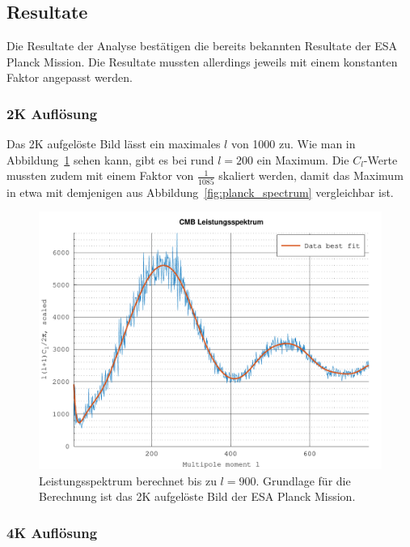 \subsection{Resultate \label{subsec:cmb:results}}

Die Resultate der Analyse bestätigen die bereits bekannten Resultate der ESA 
Planck Mission. Die Resultate mussten allerdings jeweils mit einem konstanten 
Faktor angepasst werden.

\subsubsection{2K Auflösung}

Das 2K aufgelöste Bild lässt ein maximales $l$ von 1000 zu. Wie man in 
Abbildung~\ref{fig:cmb-power-spec-900} sehen kann, gibt es bei rund $l = 200$ 
ein Maximum. Die $C_l$-Werte mussten zudem mit einem Faktor von 
$\frac{1}{1085}$ skaliert werden, damit das Maximum in etwa mit demjenigen aus 
Abbildung~\ref{fig:planck_spectrum} vergleichbar ist.

\begin{figure}
	\centering
	\includegraphics[width=\linewidth]{cmb/data/2k900-500.pdf}
	\caption{Leistungsspektrum berechnet bis zu $l = 900$. Grundlage für die 
		Berechnung ist das 2K aufgelöste Bild der ESA Planck Mission.}
	\label{fig:cmb-power-spec-900}
\end{figure}

\subsubsection{4K Auflösung}

